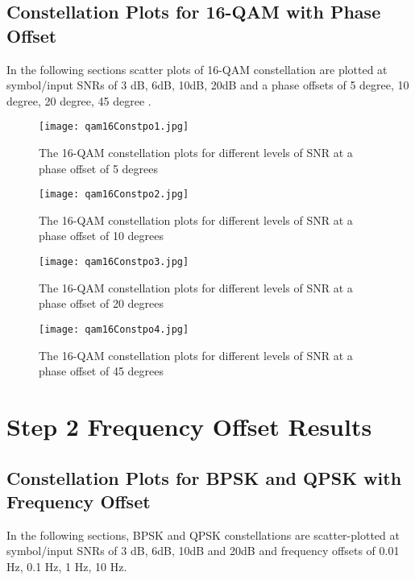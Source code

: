 \documentclass[]{article}
\begin{document}
\subsection{Constellation Plots for 16-QAM with Phase Offset}
\label{sec:qam16_phaseConst}
In the following sections scatter plots of  16-QAM constellation are plotted at symbol/input SNRs of 3 dB, 6dB, 10dB, 20dB and a phase offsets of 5 degree, 10 degree, 20 degree, 45 degree .

\begin{figure}[H]
\centering
\hspace*{-2cm}\texttt{[image: qam16Constpo1.jpg]}
\caption{The 16-QAM constellation plots for different levels of SNR at a phase offset of 5 degrees}
\end{figure}

\begin{figure}[H]
\centering
\hspace*{-2cm}\texttt{[image: qam16Constpo2.jpg]}
\caption{The 16-QAM constellation plots for different levels of SNR at a phase offset of 10 degrees}
\end{figure}

\begin{figure}[H]
\centering
\hspace*{-2cm}\texttt{[image: qam16Constpo3.jpg]}
\caption{The 16-QAM constellation plots for different levels of SNR at a phase offset of 20 degrees}
\end{figure}

\begin{figure}[H]
\centering
\hspace*{-2cm}\texttt{[image: qam16Constpo4.jpg]}
\caption{The 16-QAM constellation plots for different levels of SNR at a phase offset of 45 degrees}
\end{figure}
\newpage
\section{Step 2 Frequency Offset Results}
\label{sec:results_fo}
\subsection{Constellation Plots for BPSK and QPSK with Frequency Offset}
In the following sections,  BPSK and QPSK constellations are scatter-plotted at symbol/input SNRs of 3 dB, 6dB, 10dB and 20dB and frequency offsets of 0.01 Hz, 0.1 Hz, 1 Hz, 10 Hz.
\end{document}
